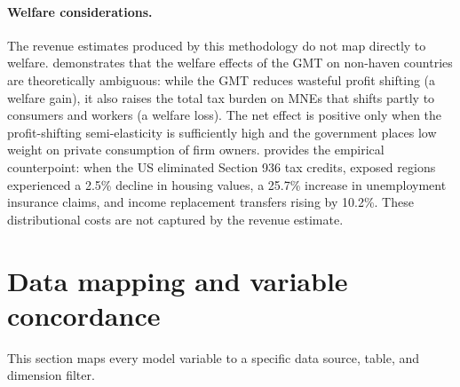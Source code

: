 \documentclass[11pt,a4paper]{article}
\begin{document}
\paragraph{Welfare considerations.} The revenue estimates produced by this methodology do not map directly to welfare. \citet{johannesen2022} demonstrates that the welfare effects of the GMT on non-haven countries are theoretically ambiguous: while the GMT reduces wasteful profit shifting (a welfare gain), it also raises the total tax burden on MNEs that shifts partly to consumers and workers (a welfare loss). The net effect is positive only when the profit-shifting semi-elasticity is sufficiently high and the government places low weight on private consumption of firm owners. \citet{suarezserrato2019} provides the empirical counterpoint: when the US eliminated Section 936 tax credits, exposed regions experienced a 2.5\% decline in housing values, a 25.7\% increase in unemployment insurance claims, and income replacement transfers rising by 10.2\%. These distributional costs are not captured by the revenue estimate.

\section{Data mapping and variable concordance}\label{sec:datamap}

This section maps every model variable to a specific data source, table, and dimension filter.
\end{document}
